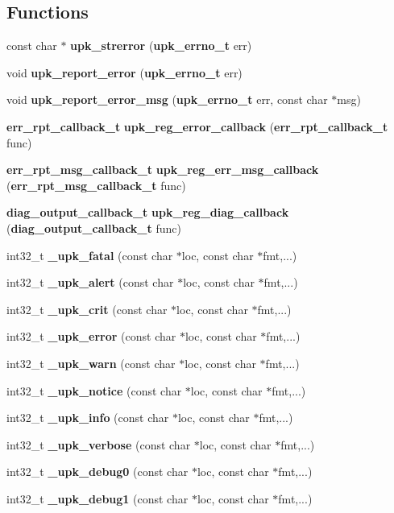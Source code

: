 \subsection*{Functions}
\begin{DoxyCompactItemize}
\item 
const char $\ast$ {\bf upk\_\-strerror} ({\bf upk\_\-errno\_\-t} err)
\item 
void {\bf upk\_\-report\_\-error} ({\bf upk\_\-errno\_\-t} err)
\item 
void {\bf upk\_\-report\_\-error\_\-msg} ({\bf upk\_\-errno\_\-t} err, const char $\ast$msg)
\item 
{\bf err\_\-rpt\_\-callback\_\-t} {\bf upk\_\-reg\_\-error\_\-callback} ({\bf err\_\-rpt\_\-callback\_\-t} func)
\item 
{\bf err\_\-rpt\_\-msg\_\-callback\_\-t} {\bf upk\_\-reg\_\-err\_\-msg\_\-callback} ({\bf err\_\-rpt\_\-msg\_\-callback\_\-t} func)
\item 
{\bf diag\_\-output\_\-callback\_\-t} {\bf upk\_\-reg\_\-diag\_\-callback} ({\bf diag\_\-output\_\-callback\_\-t} func)
\item 
int32\_\-t {\bf \_\-upk\_\-fatal} (const char $\ast$loc, const char $\ast$fmt,...)
\item 
int32\_\-t {\bf \_\-upk\_\-alert} (const char $\ast$loc, const char $\ast$fmt,...)
\item 
int32\_\-t {\bf \_\-upk\_\-crit} (const char $\ast$loc, const char $\ast$fmt,...)
\item 
int32\_\-t {\bf \_\-upk\_\-error} (const char $\ast$loc, const char $\ast$fmt,...)
\item 
int32\_\-t {\bf \_\-upk\_\-warn} (const char $\ast$loc, const char $\ast$fmt,...)
\item 
int32\_\-t {\bf \_\-upk\_\-notice} (const char $\ast$loc, const char $\ast$fmt,...)
\item 
int32\_\-t {\bf \_\-upk\_\-info} (const char $\ast$loc, const char $\ast$fmt,...)
\item 
int32\_\-t {\bf \_\-upk\_\-verbose} (const char $\ast$loc, const char $\ast$fmt,...)
\item 
int32\_\-t {\bf \_\-upk\_\-debug0} (const char $\ast$loc, const char $\ast$fmt,...)
\item 
int32\_\-t {\bf \_\-upk\_\-debug1} (const char $\ast$loc, const char $\ast$fmt,...)
\end{DoxyCompactItemize}
